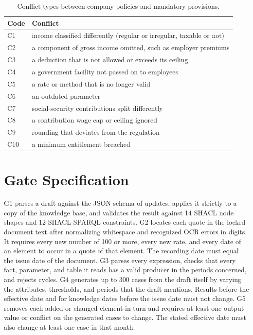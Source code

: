 \begin{table}[!h]
\caption{Conflict types between company policies and mandatory provisions.}
\label{tab:conflicts}
\centering\footnotesize
\setlength{\tabcolsep}{3pt}
\begin{tabularx}{\columnwidth}{@{}lL@{}}
\toprule
Code & Conflict \\
\midrule
C1 & income classified differently (regular or irregular, taxable or not) \\
C2 & a component of gross income omitted, such as employer premiums \\
C3 & a deduction that is not allowed or exceeds its ceiling \\
C4 & a government facility not passed on to employees \\
C5 & a rate or method that is no longer valid \\
C6 & an outdated parameter \\
C7 & social-security contributions split differently \\
C8 & a contribution wage cap or ceiling ignored \\
C9 & rounding that deviates from the regulation \\
C10 & a minimum entitlement breached \\
\bottomrule
\end{tabularx}
\end{table}

\section{Gate Specification}
\label{app:gates}
G1 parses a draft against the JSON schema of updates, applies it strictly to a copy of the knowledge base, and validates the result against 14 SHACL node shapes and 12 SHACL-SPARQL constraints. G2 locates each quote in the locked document text after normalizing whitespace and recognized OCR errors in digits. It requires every new number of 100 or more, every new rate, and every date of an element to occur in a quote of that element. The recording date must equal the issue date of the document. G3 parses every expression, checks that every fact, parameter, and table it reads has a valid producer in the periods concerned, and rejects cycles. G4 generates up to 300 cases from the draft itself by varying the attributes, thresholds, and periods that the draft mentions. Results before the effective date and for knowledge dates before the issue date must not change. G5 removes each added or changed element in turn and requires at least one output value or conflict on the generated cases to change. The stated effective date must also change at least one case in that month.

